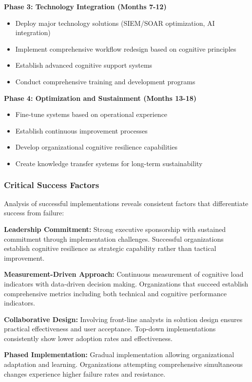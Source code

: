 \documentclass[11pt,a4paper]{article}
\begin{document}
\textbf{Phase 3: Technology Integration (Months 7-12)}
\begin{itemize}
\item Deploy major technology solutions (SIEM/SOAR optimization, AI integration)
\item Implement comprehensive workflow redesign based on cognitive principles
\item Establish advanced cognitive support systems
\item Conduct comprehensive training and development programs
\end{itemize}

\textbf{Phase 4: Optimization and Sustainment (Months 13-18)}
\begin{itemize}
\item Fine-tune systems based on operational experience
\item Establish continuous improvement processes
\item Develop organizational cognitive resilience capabilities
\item Create knowledge transfer systems for long-term sustainability
\end{itemize}

\subsubsection{Critical Success Factors}

Analysis of successful implementations reveals consistent factors that differentiate success from failure:

\textbf{Leadership Commitment:}
Strong executive sponsorship with sustained commitment through implementation challenges. Successful organizations establish cognitive resilience as strategic capability rather than tactical improvement.

\textbf{Measurement-Driven Approach:}
Continuous measurement of cognitive load indicators with data-driven decision making. Organizations that succeed establish comprehensive metrics including both technical and cognitive performance indicators.

\textbf{Collaborative Design:}
Involving front-line analysts in solution design ensures practical effectiveness and user acceptance. Top-down implementations consistently show lower adoption rates and effectiveness.

\textbf{Phased Implementation:}
Gradual implementation allowing organizational adaptation and learning. Organizations attempting comprehensive simultaneous changes experience higher failure rates and resistance.
\end{document}
